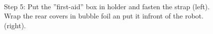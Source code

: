 \begin{figure}[!ht]
\centering
\mbox{\quad
{}}
\caption{Step 5: Put the ''first-aid'' box in holder and fasten the strap (left). Wrap the rear covers in bubble foil an put it infront of the robot. (right).} %
\end{figure}

